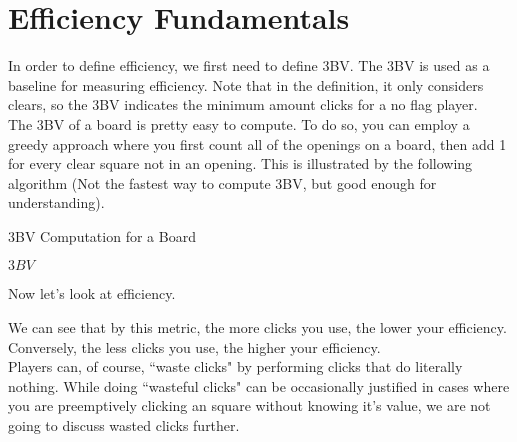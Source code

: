 \section{Efficiency Fundamentals}

In order to define efficiency, we first need to define 3BV.
The 3BV is used as a baseline for measuring efficiency. Note that in the definition, it only considers clears, so the 3BV indicates the minimum amount clicks for a no flag player.\\

The 3BV of a board is pretty easy to compute. To do so, you can employ a greedy approach where you first count all of the openings on a board, then add 1 for every clear square not in an opening. This is illustrated by the following algorithm (Not the fastest way to compute 3BV, but good enough for understanding).\\

\begin{algorithm}[h]
\caption*{3BV Computation for a Board}
\begin{algorithmic}
    \EndIf
\EndFor
{}
    \EndIf
\EndFor
\Return $3BV$
\EndFunction
\end{algorithmic}
\end{algorithm}

Now let's look at efficiency.

We can see that by this metric, the more clicks you use, the lower your efficiency. Conversely, the less clicks you use, the higher your efficiency.\\

Players can, of course, ``waste clicks" by performing clicks that do literally nothing. While doing ``wasteful clicks" can be occasionally justified in cases where you are preemptively clicking an square without knowing it's value, we are not going to discuss wasted clicks further.\\

